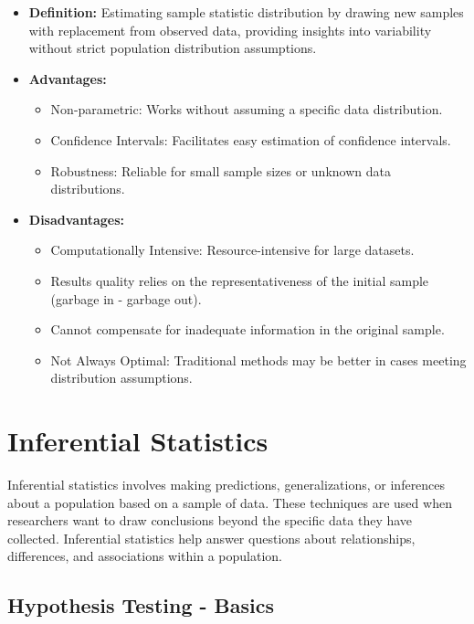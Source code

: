 \documentclass[
  a4paper,
]{scrbook}
\providecommand{\tightlist}{%
  \setlength{\itemsep}{0pt}\setlength{\parskip}{0pt}}\usepackage{longtable,booktabs,array}
\begin{document}
\begin{itemize}
\item
  \textbf{Definition:} Estimating sample statistic distribution by
  drawing new samples with replacement from observed data, providing
  insights into variability without strict population distribution
  assumptions.
\item
  \textbf{Advantages:}

  \begin{itemize}
  \tightlist
  \item
    Non-parametric: Works without assuming a specific data distribution.
  \item
    Confidence Intervals: Facilitates easy estimation of confidence
    intervals.
  \item
    Robustness: Reliable for small sample sizes or unknown data
    distributions.
  \end{itemize}
\item
  \textbf{Disadvantages:}

  \begin{itemize}
  \tightlist
  \item
    Computationally Intensive: Resource-intensive for large datasets.
  \item
    Results quality relies on the representativeness of the initial
    sample (garbage in - garbage out).
  \item
    Cannot compensate for inadequate information in the original sample.
  \item
    Not Always Optimal: Traditional methods may be better in cases
    meeting distribution assumptions.
  \end{itemize}
\end{itemize}


\chapter{Inferential Statistics}\label{inferential-statistics}

Inferential statistics involves making predictions, generalizations, or
inferences about a population based on a sample of data. These
techniques are used when researchers want to draw conclusions beyond the
specific data they have collected. Inferential statistics help answer
questions about relationships, differences, and associations within a
population.

\section{Hypothesis Testing - Basics}\label{hypothesis-testing---basics}
\end{document}
